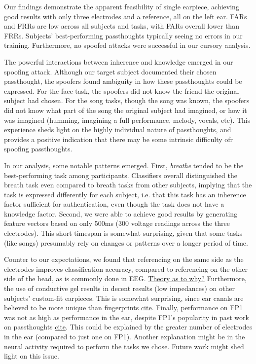 \documentclass[letterpaper,twocolumn,10pt]{article}
\begin{document}
Our findings demonstrate the apparent feasibility of single earpiece, achieving good results with only three electrodes and a reference, all on the left ear. FARs and FRRs are low across all subjects and tasks, with FARs overall lower than FRRs. Subjects' best-performing passthoughts typically seeing no errors in our training. Furthermore, no spoofed attacks were successful in our cursory analysis.

The powerful interactions between inherence and knowledge emerged in our spoofing attack. Although our target subject documented their chosen passthought, the spoofers found ambiguity in how these passthoughts could be expressed. For the face task, the spoofers did not know the friend the original subject had chosen. For the song tasks, though the song was known, the spoofers did not know what part of the song the original subject had imagined, or how it was imagined (humming, imagining a full performance, melody, vocals, etc). This experience sheds light on the highly individual nature of passthoughts, and provides a positive indication that there may be some intrinsic difficulty ofr spoofing passthoughts.

In our analysis, some notable patterns emerged. First, \textit{breathe} tended to be the best-performing task among participants. Classifiers overall distinguished the breath task even compared to breath tasks from other subjects, implying that the task is expressed differently for each subject, i.e. that this task has an inherence factor sufficient for authentication, even though the task does not have a knowledge factor. Second, we were able to achieve good results by generating feature vectors based on only 500ms (300 voltage readings across the three electrodes). This short timespan is somewhat surprising, given that some tasks (like songs) presumably rely on changes or patterns over a longer period of time. 

Counter to our expectations, we found that referencing on the same side as the electrodes improves classification accuracy, compared to referencing on the other side of the head, as is commonly done in EEG. \underline{Theory as to why?} Furthermore, the use of conductive gel results in decent results (low impedances) on other subjects' custom-fit earpieces. This is somewhat surprising, since ear canals are believed to be more unique than fingerprints \underline{cite}. Finally, performance on FP1 was not as high as performance in the ear, despite FP1's popularity in past work on passthoughts \underline{cite}. This could be explained by the greater number of electrodes in the ear (compared to just one on FP1). Another explanation might be in the neural activity required to perform the tasks we chose. Future work might shed light on this issue.
\end{document}

